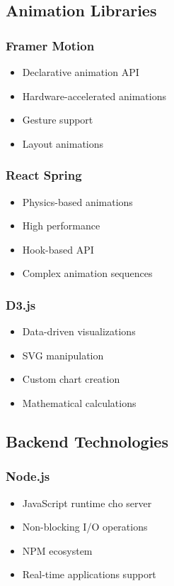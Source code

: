 \subsection{Animation Libraries}
\label{subsec:animation-libs}

\subsubsection{Framer Motion}
\begin{itemize}
    \item Declarative animation API
    \item Hardware-accelerated animations
    \item Gesture support
    \item Layout animations
\end{itemize}

\subsubsection{React Spring}
\begin{itemize}
    \item Physics-based animations
    \item High performance
    \item Hook-based API
    \item Complex animation sequences
\end{itemize}

\subsubsection{D3.js}
\begin{itemize}
    \item Data-driven visualizations
    \item SVG manipulation
    \item Custom chart creation
    \item Mathematical calculations
\end{itemize}

\subsection{Backend Technologies}
\label{subsec:backend-tech}

\subsubsection{Node.js}
\begin{itemize}
    \item JavaScript runtime cho server
    \item Non-blocking I/O operations
    \item NPM ecosystem
    \item Real-time applications support
\end{itemize}

